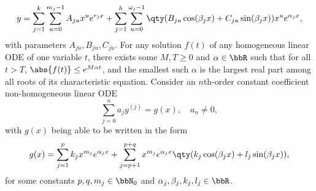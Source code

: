\documentclass[a4paper,12pt]{article}
\begin{document}
\[y=\sum_{j=1}^k\sum_{u=0}^{m_j-1}A_{ju}x^ue^{r_jx}+\sum_{j=1}^h\sum_{u=0}^{\omega_j-1}\qty(B_{ju}\cos(\beta_jx)+C_{ju}\sin(\beta_jx))x^ue^{\alpha_jx},\]
with parameters $A_{ju},B_{ju},C_{ju}$.
\een
{}
For any solution $f(t)$ of any homogeneous linear ODE of one variable $t$, there exists some $M,T\geq 0$ and $\alpha\in\bbR$ such that for all $t>T$, $\abs{f(t)}\leq e^{M\alpha t}$, and the smallest such $\alpha$ is the largest real part among all roots of its characteristic equation.
Consider an $n$th-order constant coefficient non-homogeneous linear ODE
\[\sum_{j=0}^na_jy^{(j)}=g(x),\quad a_n\neq 0,\]
with $g(x)$ being able to be written in the form
\[g(x)=\sum_{j=1}^pk_jx^{m_j}e^{\alpha_jx}+\sum_{j=p+1}^{p+q}x^{m_j}e^{\alpha_jx}\qty(k_j\cos(\beta_jx)+l_j\sin(\beta_jx)),\]
for some constants $p,q,m_j\in\bbN_0$ and $\alpha_j,\beta_j,k_j,l_j\in\bbR$.
\end{document}
